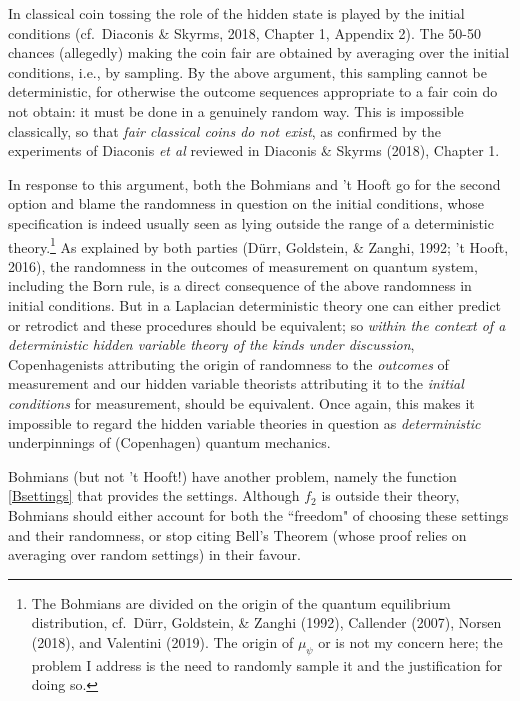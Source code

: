 \documentclass[12pt]{article}
\numberwithin{equation}{section}
\newcommand{\qm}{quantum mechanics}
\newcommand{\er}{\eqref}
\begin{document}
In classical coin tossing the role of the hidden state is played by  the initial conditions (cf.\ Diaconis \& Skyrms, 2018, Chapter 1, Appendix 2). The 50-50 chances (allegedly) making the coin fair are obtained by averaging over the initial conditions, i.e., by sampling. By the above argument, this sampling cannot be  deterministic, for otherwise the outcome sequences appropriate to a fair coin do not obtain: it must be done in a genuinely random way. This is  impossible classically, so that \emph{fair classical coins do not exist}, as  confirmed by the experiments of Diaconis \emph{et al} reviewed in Diaconis \& Skyrms (2018), Chapter 1.

In response to this argument, both the Bohmians and 't Hooft go for the second option and blame the randomness in question on the initial conditions,  whose specification is indeed  usually seen as lying outside the range of a deterministic theory.\footnote{The Bohmians are  divided on the origin of the quantum equilibrium distribution, cf.\ 
D\"{u}rr, Goldstein, \& Zanghi (1992),  Callender (2007), Norsen (2018), and  Valentini (2019).  The origin of $\mu_{\psi}$ or  is not my concern here; the problem I address is the need to randomly sample it and the justification for doing so.
} As explained by both parties 
(D\"{u}rr, Goldstein, \& Zanghi, 1992; 't Hooft, 2016), the randomness in the outcomes of measurement on quantum system, including the Born rule, is a direct consequence of the above randomness in initial conditions. But  in a Laplacian deterministic theory  one can either predict or retrodict and these procedures should be equivalent; so \emph{within the context of a deterministic hidden variable theory of the kinds under discussion}, Copenhagenists attributing the origin of randomness to the \emph{outcomes} of measurement and our hidden variable theorists attributing it to the \emph{initial conditions} for measurement, should be equivalent. Once again, this makes it impossible to regard the hidden variable theories in question as \emph{deterministic} underpinnings of (Copenhagen) \qm.

 Bohmians (but not 't Hooft!)  have another problem, namely 
  the function \er{Bsettings} that provides the  settings.  Although $f_2$ is outside their theory,  Bohmians 
  should either account for both the ``freedom" of choosing these settings and their randomness, or stop citing Bell's Theorem  (whose proof relies on averaging over random settings) in their favour.
  
\end{document}
